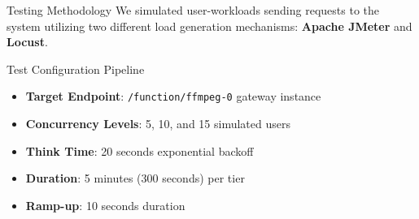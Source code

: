 \documentclass[aspectratio=169,10pt]{beamer}
\begin{document}
\begin{frame}{Testing Methodology}
    We simulated user-workloads sending requests to the system utilizing two different load generation mechanisms: \textbf{Apache JMeter} and \textbf{Locust}.
    \vspace{0.2cm}
    
    \begin{exampleblock}{Test Configuration Pipeline}
        \begin{itemize}[<+->]
            \item \textbf{Target Endpoint}: \texttt{/function/ffmpeg-0} gateway instance
            \item \textbf{Concurrency Levels}: 5, 10, and 15 simulated users
            \item \textbf{Think Time}: 20 seconds exponential backoff
            \item \textbf{Duration}: 5 minutes (300 seconds) per tier
            \item \textbf{Ramp-up}: 10 seconds duration
        \end{itemize}
    \end{exampleblock}
\end{frame}
\end{document}
